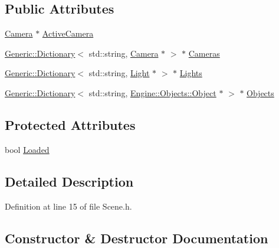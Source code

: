 \subsection*{Public Attributes}
\begin{DoxyCompactItemize}
\item 
\mbox{\hyperlink{classEngine_1_1Components_1_1Camera}{Camera}} $\ast$ \mbox{\hyperlink{classEngine_1_1Components_1_1Scene_a9408befee37d89e2c001d25b9e4ed75a}{Active\+Camera}}
\item 
\mbox{\hyperlink{classGeneric_1_1Dictionary}{Generic\+::\+Dictionary}}$<$ std\+::string, \mbox{\hyperlink{classEngine_1_1Components_1_1Camera}{Camera}} $\ast$ $>$ $\ast$ \mbox{\hyperlink{classEngine_1_1Components_1_1Scene_aea98ff1ced88ee859878b504e9a2a362}{Cameras}}
\item 
\mbox{\hyperlink{classGeneric_1_1Dictionary}{Generic\+::\+Dictionary}}$<$ std\+::string, \mbox{\hyperlink{classLight}{Light}} $\ast$ $>$ $\ast$ \mbox{\hyperlink{classEngine_1_1Components_1_1Scene_a00f60de2f6c72242a7af0076a3b75e5e}{Lights}}
\item 
\mbox{\hyperlink{classGeneric_1_1Dictionary}{Generic\+::\+Dictionary}}$<$ std\+::string, \mbox{\hyperlink{classEngine_1_1Objects_1_1Object}{Engine\+::\+Objects\+::\+Object}} $\ast$ $>$ $\ast$ \mbox{\hyperlink{classEngine_1_1Components_1_1Scene_a23481feabaaa56bf5613765db03af4da}{Objects}}
\end{DoxyCompactItemize}
\subsection*{Protected Attributes}
\begin{DoxyCompactItemize}
\item 
bool \mbox{\hyperlink{classEngine_1_1Components_1_1Scene_ae828757eea5410550f6674421051a783}{Loaded}}
\end{DoxyCompactItemize}


\subsection{Detailed Description}


Definition at line 15 of file Scene.\+h.



\subsection{Constructor \& Destructor Documentation}
\mbox{\label{classEngine_1_1Components_1_1Scene_a64255073fa1568920613cdc10472c335}} 
